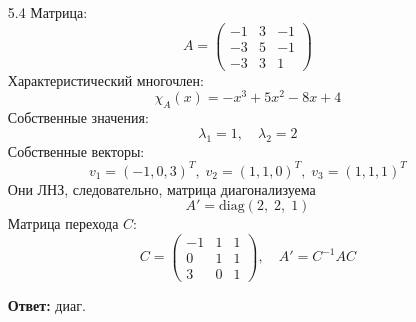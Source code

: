 \documentclass[a4paper]{article}
\begin{document}
\begin{enumerate}
    \item[5.4]Матрица:
    \[
    A =
    \begin{pmatrix}
    -1 & 3 & -1\\
    -3 & 5 & -1\\
    -3 & 3 & 1
    \end{pmatrix}
    \]
    Характеристический многочлен:
    \[
    \chi_A(x) = -x^3 + 5x^2 - 8x + 4
    \]
    Собственные значения:
    \[
    \lambda_1 = 1,\quad \lambda_2 = 2
    \]
    Собственные векторы:
    \[
    v_1 = (-1,0,3)^T,\;
    v_2 = (1,1,0)^T,\;
    v_3 = (1,1,1)^T
    \]
    Они ЛНЗ, следовательно, матрица диагонализуема
    \[
    A' = \mathrm{diag}(2,\;2,\;1)
    \]
    Матрица перехода \(C\):
    \[
    C = \begin{pmatrix}
    -1 & 1 & 1\\
    0 & 1 & 1\\
    3 & 0 & 1
    \end{pmatrix},
    \quad A' = C^{-1}AC
    \]

    \textbf{Ответ: } диаг.\\
    
  \end{enumerate}
\end{document}
